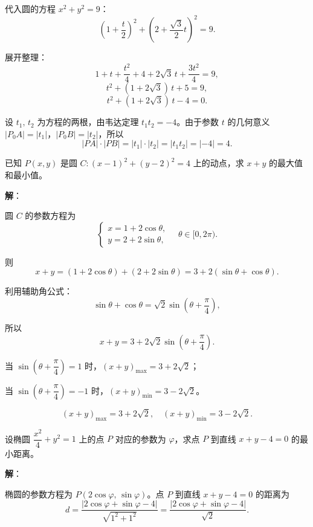 \documentclass[12pt,a4paper]{ctexart}
\theoremstyle{definition}
\begin{document}
代入圆的方程 $x^2+y^2=9$：
\[
  \left(1+\frac{t}{2}\right)^2 + \left(2+\frac{\sqrt{3}}{2}t\right)^2 = 9.
\]

展开整理：
\[
  1 + t + \frac{t^2}{4} + 4 + 2\sqrt{3}\,t + \frac{3t^2}{4} = 9,
\]
\[
  t^2 + (1+2\sqrt{3})\,t + 5 = 9,
\]
\[
  t^2 + (1+2\sqrt{3})\,t - 4 = 0.
\]

设 $t_1,\,t_2$ 为方程的两根，由韦达定理 $t_1 t_2 = -4$。由于参数 $t$ 的几何意义 $|P_0A|=|t_1|$，$|P_0B|=|t_2|$，所以
\[
  |PA|\cdot|PB| = |t_1| \cdot |t_2| = |t_1 t_2| = |-4| = \boxed{4}.
\]

\begin{example}
  已知 $P(x,y)$ 是圆 $C:(x-1)^2+(y-2)^2=4$ 上的动点，求 $x+y$ 的最大值和最小值。
\end{example}

\textbf{解}：

圆 $C$ 的参数方程为
\[
  \begin{cases}
    x = 1 + 2\cos\theta, \\
    y = 2 + 2\sin\theta,
  \end{cases}
  \quad \theta \in [0,2\pi).
\]

则
\[
  x + y = (1+2\cos\theta) + (2+2\sin\theta) = 3 + 2(\sin\theta + \cos\theta).
\]

利用辅助角公式：
\[
  \sin\theta + \cos\theta = \sqrt{2}\sin\!\left(\theta+\frac{\pi}{4}\right),
\]

所以
\[
  x+y = 3 + 2\sqrt{2}\sin\!\left(\theta+\frac{\pi}{4}\right).
\]

当 $\sin\!\left(\theta+\dfrac{\pi}{4}\right)=1$ 时，$(x+y)_{\max} = 3 + 2\sqrt{2}$；

当 $\sin\!\left(\theta+\dfrac{\pi}{4}\right)=-1$ 时，$(x+y)_{\min} = 3 - 2\sqrt{2}$。

\[
  \boxed{(x+y)_{\max} = 3+2\sqrt{2},\quad (x+y)_{\min} = 3-2\sqrt{2}.}
\]

\begin{example}
  设椭圆 $\dfrac{x^2}{4}+y^2=1$ 上的点 $P$ 对应的参数为 $\varphi$，求点 $P$ 到直线 $x+y-4=0$ 的最小距离。
\end{example}

\textbf{解}：

椭圆的参数方程为 $P(2\cos\varphi,\,\sin\varphi)$。点 $P$ 到直线 $x+y-4=0$ 的距离为
\[
  d = \frac{|2\cos\varphi + \sin\varphi - 4|}{\sqrt{1^2+1^2}} = \frac{|2\cos\varphi+\sin\varphi-4|}{\sqrt{2}}.
\]
\end{document}
